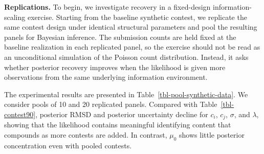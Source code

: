 \documentclass[mnsc]{informs3}
\begin{document}
\textbf{Replications.}
To begin, we investigate recovery in a fixed-design information-scaling exercise.
Starting from the baseline synthetic contest, we replicate the same contest design under identical structural parameters and pool the resulting panels for Bayesian inference.
The submission counts are held fixed at the baseline realization in each replicated panel, so the exercise should not be read as an unconditional simulation of the Poisson count distribution.
Instead, it asks whether posterior recovery improves when the likelihood is given more observations from the same underlying information environment.

The experimental results are presented in Table~\ref{tbl-pool-synthetic-data}.
We consider pools of 10 and 20 replicated panels.
Compared with Table~\ref{tbl-contest90}, posterior RMSD and posterior uncertainty decline for $c_i$, $c_j$, $\sigma$, and $\lambda$, showing that the likelihood contains meaningful identifying content that compounds as more contests are added.
In contrast, $\mu_0$ shows little posterior concentration even with pooled contests.
\end{document}
